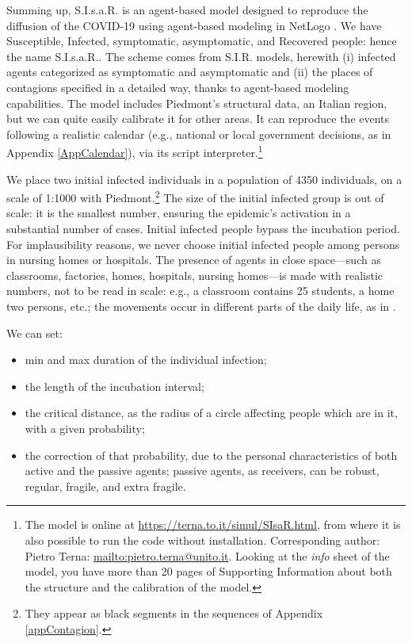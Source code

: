 \documentclass[11pt]{article}
\begin{document}
Summing up, S.I.s.a.R. \citep{SIsaR} is an agent-based model designed to reproduce the diffusion of the COVID-19 using agent-based modeling in NetLogo \citep{NetLogo}. We have Susceptible, Infected, symptomatic, asymptomatic, and Recovered people: hence the name S.I.s.a.R.. The scheme comes from S.I.R. models, herewith (i) infected agents categorized as symptomatic and asymptomatic and (ii) the places of contagions specified in a detailed way, thanks to agent-based modeling capabilities. The model includes Piedmont's structural data, an Italian region, but we can quite easily calibrate it for other areas. It can reproduce the events following a realistic calendar (e.g., national or local government decisions, as in Appendix \ref{AppCalendar}), via its script interpreter.\footnote{\label{modOnLine}The model is online at \url{https://terna.to.it/simul/SIsaR.html}, from where it is also possible to run the code without installation. Corresponding author: Pietro Terna: \url{mailto:pietro.terna@unito.it}. Looking at the \emph{info} sheet of the model, you have more than 20 pages of Supporting Information about both the structure and the calibration of the model.}

We place two initial infected individuals in a population of 4350 individuals, on a scale of 1:1000 with Piedmont.\footnote{They appear as black segments in the sequences of Appendix \ref{appContagion}.} The size of the initial infected group is out of scale: it is the smallest number, ensuring the epidemic's activation in a substantial number of cases. Initial infected people bypass the incubation period. For implausibility reasons, we never choose initial infected people among persons in nursing homes or hospitals. The presence of agents in close space---such as classrooms, factories, homes, hospitals, nursing homes---is made with realistic numbers, not to be read in scale: e.g., a classroom contains 25 students, a home two persons, etc.; the movements occur in different parts of the daily life, as in \cite{ghorbani2020assocc}.

We can set: 
\begin{itemize}
\setlength\itemsep{0.3em}
\item min and max duration of the individual infection;

\item the length of the incubation interval;

\item the critical distance, as the radius of a circle affecting people which are in it, with a given probability;

\item the correction of that probability, due to the personal characteristics of both active and the passive agents; passive agents, as receivers, can be robust, regular, fragile, and extra fragile.

\end{itemize} 
\end{document}
